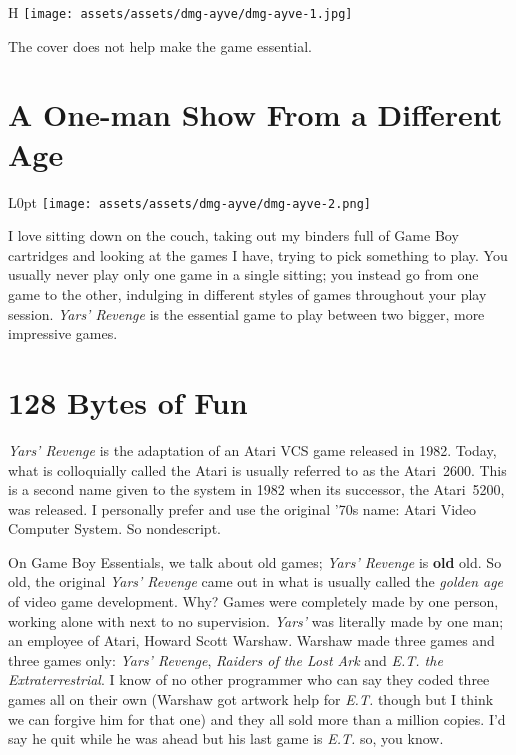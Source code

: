 \documentclass{book}
\begin{document}
\begin{wrapfigure}{H}{\linewidth}
\vskip 4pt
\centering \texttt{[image: assets/assets/dmg-ayve/dmg-ayve-1.jpg]}\par\pagetwodescription The cover does not help make the game essential.\end{wrapfigure}
\clearpage

\FloatBarrier\needspace{5pt}\section*{A One-man Show From a Different Age}\nopagebreak[4]

\begin{wrapfigure}{L}{0pt} \texttt{[image: assets/assets/dmg-ayve/dmg-ayve-2.png]}\end{wrapfigure}
I love sitting down on the couch, taking out my binders full of Game Boy cartridges and looking at the games I have, trying to pick something to play. You usually never play only one game in a single sitting; you instead go from one game to the other, indulging in different styles of games throughout your play session. \emph{Yars’ Revenge} is the essential game to play between two bigger, more impressive games.

\FloatBarrier\needspace{5pt}\section*{128 Bytes of Fun}\nopagebreak[4]

\emph{Yars’ Revenge} is the adaptation of an Atari VCS game released in 1982. Today, what is colloquially called the Atari is usually referred to as the Atari 2600. This is a second name given to the system in 1982 when its successor, the Atari 5200, was released. I personally prefer and use the original ’70s name: Atari Video Computer System. So nondescript.

On Game Boy Essentials, we talk about old games; \emph{Yars’ Revenge} is \textbf{old} old. So old, the original \emph{Yars’ Revenge} came out in what is usually called the \emph{golden age} of video game development. Why? Games were completely made by one person, working alone with next to no supervision. \emph{Yars’} was literally made by one man; an employee of Atari, Howard Scott Warshaw. Warshaw made three games and three games only: \emph{Yars’ Revenge}, \emph{Raiders of the Lost Ark} and \emph{E.T. the Extraterrestrial}. I know of no other programmer who can say they coded three games all on their own (Warshaw got artwork help for \emph{E.T.} though but I think we can forgive him for that one) and they all sold more than a million copies. I’d say he quit while he was ahead but his last game is \emph{E.T.} so, you know.
\end{document}
